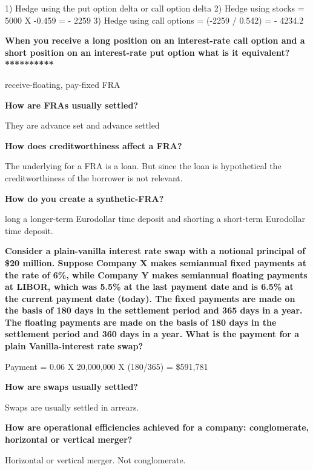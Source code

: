 \documentclass[12pt]{article}
\begin{document}
1) Hedge using the put option delta or call option delta
2) Hedge using stocks = 5000 X -0.459 = - 2259
3) Hedge using call options  = (-2259 / 0.542) =  - 4234.2

\textbf{When you receive a long position on an interest-rate call option and a short position on an interest-rate put option what is it equivalent? **********}

receive-floating, pay-fixed FRA


\begin{framed}
\textbf{How are FRAs usually settled?}

They are advance set and advance settled

\textbf{How does creditworthiness affect a FRA?}

The underlying for a FRA is a loan. But since the loan is hypothetical the creditworthiness of the borrower is not relevant. 

\textbf{How do you create a synthetic-FRA?}

long a longer-term Eurodollar time deposit and shorting a short-term Eurodollar time deposit.


\end{framed}


\textbf{Consider a plain-vanilla interest rate swap with a notional principal of \$20 million. Suppose Company X makes semiannual fixed payments at the rate of 6\%, while Company Y makes semiannual floating payments at LIBOR, which was 5.5\% at the last payment date and is 6.5\% at the current payment date (today). The fixed payments are made on the basis of 180 days in the settlement period and 365 days in a year. The floating payments are made on the basis of 180 days in the settlement period and 360 days in a year. What is the payment for a plain Vanilla-interest rate swap?}

Payment = 0.06 X 20,000,000 X (180/365) = \$591,781


\textbf{How are swaps usually settled?}

Swaps are usually settled in arrears.

\textbf{How are operational efficiencies achieved for a company: conglomerate, horizontal or vertical merger?}

Horizontal or vertical merger. Not conglomerate.
\end{document}
